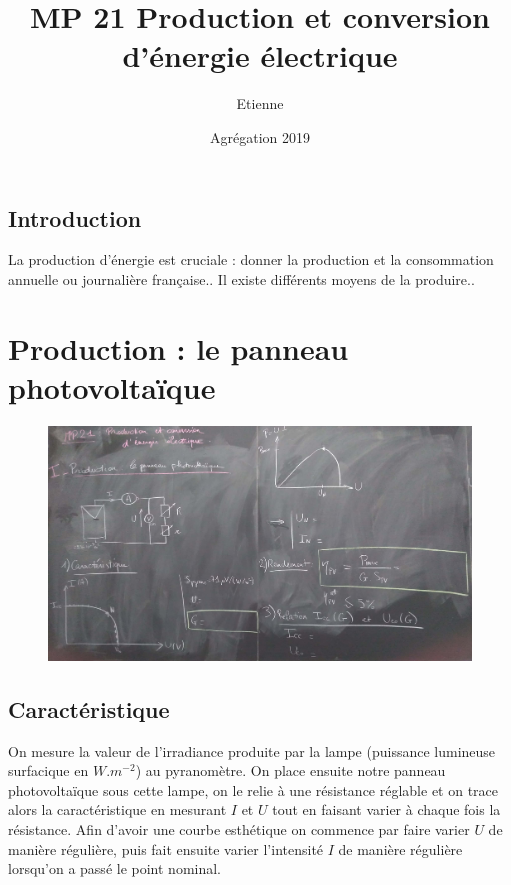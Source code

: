 \documentclass[12pt,prb,aps,epsf]{article}
\begin{document}
	
	\title{MP 21 Production et conversion d'énergie électrique}
	\author{Etienne}
	\date{Agrégation 2019}
	
	\maketitle
	
	\tableofcontents
	
	\pagebreak
	
\subsection{Introduction}
La production d'énergie est cruciale : donner la production et la consommation annuelle ou journalière française.. Il existe différents moyens de la produire..
\section{Production : le panneau photovoltaïque}
\begin{figure}
	\centering \includegraphics[width=18cm]{T1}
\end{figure}

\subsection{Caractéristique}
On mesure la valeur de l'irradiance produite par la lampe (puissance lumineuse surfacique en $W.m^{-2}$) au pyranomètre. On place ensuite notre panneau photovoltaïque sous cette lampe, on le relie à une résistance réglable et on trace alors la caractéristique en mesurant $I$ et $U$ tout en faisant varier à chaque fois la résistance. Afin d'avoir une courbe esthétique on commence par faire varier $U$ de manière régulière, puis fait ensuite varier l'intensité $I$ de manière régulière lorsqu'on a passé le point nominal.\\
\end{document}
